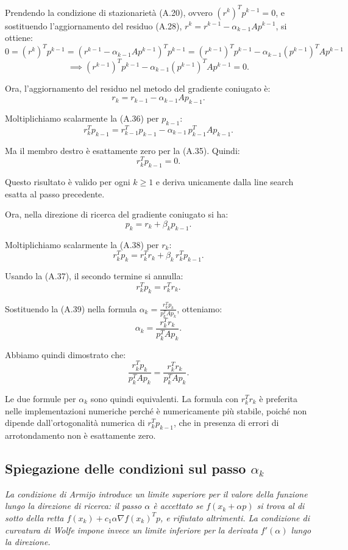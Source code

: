 \documentclass[a4paper,12pt]{article}
\begin{document}
Prendendo la condizione di stazionarietà (A.20), ovvero $(r^k)^T p^{k-1} = 0$, e sostituendo l'aggiornamento del residuo (A.28), $r^k = r^{k-1} - \alpha_{k-1} A p^{k-1}$, si ottiene:
\[
0 = (r^k)^T p^{k-1} = (r^{k-1} - \alpha_{k-1} A p^{k-1})^T p^{k-1}
= (r^{k-1})^T p^{k-1} - \alpha_{k-1} (p^{k-1})^T A p^{k-1}\]\[\implies
(r^{k-1})^T p^{k-1} - \alpha_{k-1} (p^{k-1})^T A p^{k-1} = 0. \tag{A.35}
\]

Ora, l'aggiornamento del residuo nel metodo del gradiente coniugato è:
\[
r_k = r_{k-1} - \alpha_{k-1} A p_{k-1}. \tag{A.36}
\]

Moltiplichiamo scalarmente la (A.36) per $p_{k-1}$:
\[
r_k^T p_{k-1} = r_{k-1}^T p_{k-1} - \alpha_{k-1} \, p_{k-1}^T A p_{k-1}.
\]

Ma il membro destro è esattamente zero per la (A.35). Quindi:
\[
r_k^T p_{k-1} = 0. \tag{A.37}
\]

Questo risultato è valido per ogni $k \ge 1$ e deriva unicamente dalla line search esatta al passo precedente.

Ora, nella direzione di ricerca del gradiente coniugato si ha:
\[
p_k = r_k + \beta_k p_{k-1}. \tag{A.38}
\]

Moltiplichiamo scalarmente la (A.38) per $r_k$:
\[
r_k^T p_k = r_k^T r_k + \beta_k \, r_k^T p_{k-1}.
\]

Usando la (A.37), il secondo termine si annulla:
\[
r_k^T p_k = r_k^T r_k. \tag{A.39}
\]

Sostituendo la (A.39) nella formula $\alpha_k = \frac{r_k^T p_k}{p_k^T A p_k}$, otteniamo:
\[
\alpha_k = \frac{r_k^T r_k}{p_k^T A p_k}. \tag{A.40}
\]

Abbiamo quindi dimostrato che:
\[
\frac{r_k^T p_k}{p_k^T A p_k} = \frac{r_k^T r_k}{p_k^T A p_k}.
\]

Le due formule per $\alpha_k$ sono quindi equivalenti. La formula con $r_k^T r_k$ è preferita nelle implementazioni numeriche perché è numericamente più stabile, poiché non dipende dall'ortogonalità numerica di $r_k^T p_{k-1}$, che in presenza di errori di arrotondamento non è esattamente zero.
\newpage
\subsection{Spiegazione delle condizioni sul passo $\alpha_k$}
\textit{
La condizione di Armijo introduce un limite superiore per il valore della funzione lungo la direzione di ricerca: il passo $\alpha$ è accettato se $f(x_k+\alpha p)$ si trova al di sotto della retta $f(x_k)+c_1\alpha\nabla f(x_k)^Tp$, e rifiutato altrimenti. La condizione di curvatura di Wolfe impone invece un limite inferiore per la derivata $f'(\alpha)$ lungo la direzione.
}
\end{document}

